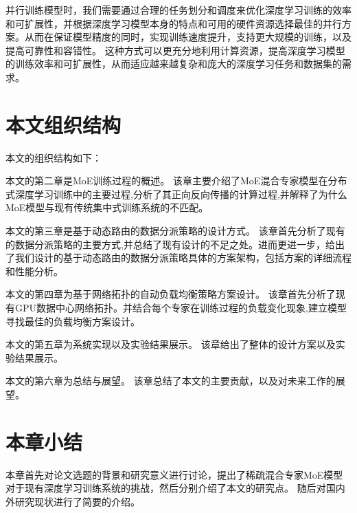 并行训练模型时，我们需要通过合理的任务划分和调度来优化深度学习训练的效率和可扩展性，并根据深度学习模型本身的特点和可用的硬件资源选择最佳的并行方案。从而在保证模型精度的同时，实现训练速度提升，支持更大规模的训练，以及提高可靠性和容错性。
% 
这种方式可以更充分地利用计算资源，提高深度学习模型的训练效率和可扩展性，从而适应越来越复杂和庞大的深度学习任务和数据集的需求。

\section{本文组织结构}

本文的组织结构如下：

本文的第二章是MoE训练过程的概述。
% 
该章主要介绍了MoE混合专家模型在分布式深度学习训练中的主要过程,分析了其正向反向传播的计算过程,并解释了为什么MoE模型与现有传统集中式训练系统的不匹配。

本文的第三章是基于动态路由的数据分派策略的设计方式。
%
该章首先分析了现有的数据分派策略的主要方式,并总结了现有设计的不足之处。进而更进一步，给出了我们设计的基于动态路由的数据分派策略具体的方案架构，包括方案的详细流程和性能分析。


本文的第四章为基于网络拓扑的自动负载均衡策略方案设计。
%
该章首先分析了现有GPU数据中心网络拓扑。并结合每个专家在训练过程的负载变化现象,建立模型寻找最佳的负载均衡方案设计。


本文的第五章为系统实现以及实验结果展示。
%
该章给出了整体的设计方案以及实验结果展示。

本文的第六章为总结与展望。
%
该章总结了本文的主要贡献，以及对未来工作的展望。


\section{本章小结}

本章首先对论文选题的背景和研究意义进行讨论，提出了稀疏混合专家MoE模型对于现有深度学习训练系统的挑战，然后分别介绍了本文的研究点。
%
随后对国内外研究现状进行了简要的介绍。

\endinput